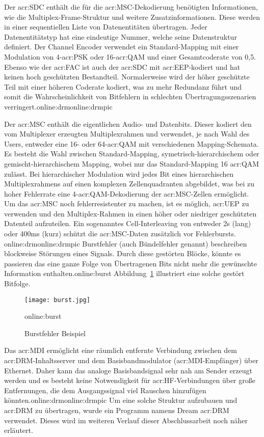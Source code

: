 Der \gls{acr:SDC} enthält die für die \gls{acr:MSC}-Dekodierung benötigten Informationen, wie die Multiplex-Frame-Struktur und weitere Zusatzinformationen. Diese werden in einer sequentiellen Liste von Datenentitäten übertragen. Jeder Datenentitätstyp hat eine eindeutige Nummer, welche seine Datenstruktur definiert. Der Channel Encoder verwendet ein Standard-Mapping mit einer Modulation von 4-\gls{acr:PSK} oder 16-\gls{acr:QAM} und einer Gesamtcoderate von 0,5. Ebenso wie der \gls{acr:FAC} ist auch der \gls{acr:SDC} mit  \gls{acr:EEP}-kodiert und hat keinen hoch geschützten Bestandteil. Normalerweise wird der höher geschützte Teil mit einer höheren Coderate kodiert, was zu mehr Redundanz führt und somit die Wahrscheinlichkeit von Bitfehlern in schlechten Übertragungsszenarien verringert.\gls{online:drm}\gls{online:drmpic} 

Der \gls{acr:MSC} enthält die eigentlichen Audio- und Datenbits. Dieser kodiert den vom Multiplexer erzeugten Multiplexrahmen und verwendet, je nach Wahl des Users, entweder eine 16- oder 64-\gls{acr:QAM} mit verschiedenen Mapping-Schemata. Es besteht die Wahl zwischen Standard-Mapping, symetrisch-hierarchischem oder gemischt-hierarchischem Mapping, wobei nur das Standard-Mapping 16 \gls{acr:QAM} zulässt. Bei hierarchischer Modulation wird jedes Bit eines hierarchischen Multiplexrahmens auf einen komplexen Zellenquadranten abgebildet, was bei zu hoher Fehlerrate eine 4-\gls{acr:QAM}-Dekodierung der \gls{acr:MSC}-Zellen ermöglicht. Um das \gls{acr:MSC} noch fehlerresistenter zu machen, ist es möglich, \gls{acr:UEP} zu verwenden und den Multiplex-Rahmen in einen höher oder niedriger geschützten Datenteil aufzuteilen. Ein sogenanntes Cell-Interleaving von entweder 2s (lang) oder 400ms (kurz) schützt die \gls{acr:MSC}-Daten zusätzlich vor Fehlerbursts. \gls{online:drm}\gls{online:drmpic}  Burstfehler (auch Bündelfehler genannt) beschreiben blockweise Störungen eines Signals. Durch diese gestörten Blöcke, könnte es passieren das eine ganze Folge von Übertragenen Bits nicht mehr die gewünschte Information enthalten.\gls{online:burst} Abbildung~\ref{fig:burst} illustriert eine solche gestört Bitfolge.
 \begin{figure}[H]
 	\centering
 	\texttt{[image: burst.jpg]}
 	\caption[Burstfehler Beispiel]{Burstfehler Beispiel} 
 	\gls{online:burst}
 	\label{fig:burst}
 \end{figure}
Das \gls{acr:MDI} ermöglicht eine räumlich entfernte Verbindung zwischen dem \gls{acr:DRM}-Inhaltsserver und dem Basisbandmodulator (\gls{acr:MDI}-Empfänger) über Ethernet. Daher kann das analoge Basisbandsignal sehr nah am Sender erzeugt werden und es besteht keine Notwendigkeit für \gls{acr:HF}-Verbindungen über große Entfernungen, die dem Ausgangssignal viel Rauschen hinzufügen könnten.\gls{online:drm}\gls{online:drmpic} Um eine solche Struktur aufzubauen und \gls{acr:DRM} zu übertragen, wurde ein Programm namens Dream \gls{acr:DRM} verwendet. Dieses wird im weiteren Verlauf dieser Abschlussarbeit noch näher erläutert. 
\newpage
